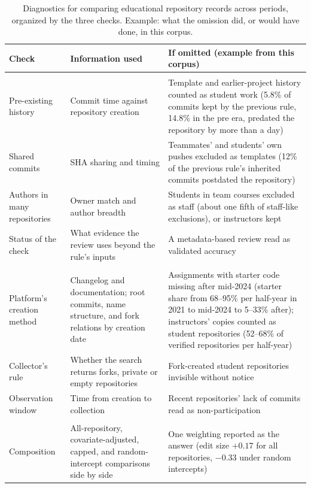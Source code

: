 \documentclass[acmsmall,screen,review,anonymous]{acmart}
\begin{document}
\begin{table}
\caption{Diagnostics for comparing educational repository records across periods, organized by the three checks. Example: what the omission did, or would have done, in this corpus.}
\label{tab:diagnostics}
\scriptsize
\setlength{\tabcolsep}{3pt}
\begin{tabular}{@{}>{\raggedright\arraybackslash}p{2.5cm} >{\raggedright\arraybackslash}p{3.6cm} >{\raggedright\arraybackslash}p{6.4cm}@{}}
\toprule
Check & Information used & If omitted (example from this corpus) \\
\midrule
\multicolumn{3}{@{}l}{\textit{Activity attribution}} \\
Pre-existing history & Commit time against repository creation & Template and earlier-project history counted as student work (5.8\% of commits kept by the previous rule, 14.8\% in the pre era, predated the repository by more than a day) \\
Shared commits & SHA sharing and timing & Teammates' and students' own pushes excluded as templates (12\% of the previous rule's inherited commits postdated the repository) \\
Authors in many repositories & Owner match and author breadth & Students in team courses excluded as staff (about one fifth of staff-like exclusions), or instructors kept \\
Status of the check & What evidence the review uses beyond the rule's inputs & A metadata-based review read as validated accuracy \\
\midrule
\multicolumn{3}{@{}l}{\textit{Record generation and collection}} \\
Platform's creation method & Changelog and documentation; root commits, name structure, and fork relations by creation date & Assignments with starter code missing after mid-2024 (starter share from 68--95\% per half-year in 2021 to mid-2024 to 5--33\% after); instructors' copies counted as student repositories (52--68\% of verified repositories per half-year) \\
Collector's rule & Whether the search returns forks, private or empty repositories & Fork-created student repositories invisible without notice \\
Observation window & Time from creation to collection & Recent repositories' lack of commits read as non-participation \\
\midrule
\multicolumn{3}{@{}l}{\textit{Organization weighting}} \\
Composition & All-repository, covariate-adjusted, capped, and random-intercept comparisons side by side & One weighting reported as the answer (edit size $+0.17$ for all repositories, $-0.33$ under random intercepts) \\

\end{tabular}
\end{table}
\end{document}
